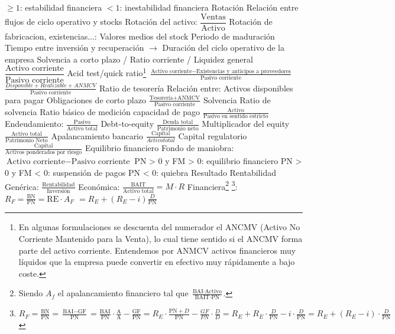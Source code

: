 \documentclass{nuevotema}
\begin{document}
\begin{esquemal}
				\4 $\geq 1$: estabilidad financiera
				\4 $<1$: inestabilidad financiera
			\3 Rotación
				\4 Relación entre flujos de ciclo operativo y stocks
				\4 Rotación del activo:
				\4[] $\dfrac{\text{Ventas}}{\text{Activo}}$
				\4 Rotación de fabricacion, existencias...:
				\4[] Valores medios del stock
			\3 Periodo de maduración
				\4 Tiempo entre inversión y recuperación
				\4[] $\to$ Duración del ciclo operativo de la empresa
			\3 Solvencia a corto plazo / Ratio corriente / Liquidez general
				\4 $\dfrac{\text{Activo corriente}}{\text{Pasivo corriente}}$
			\3 Acid test/quick ratio\footnote{En algunas formulaciones se descuenta del numerador el ANCMV (Activo No Corriente Mantenido para la Venta), lo cual tiene sentido si el ANCMV forma parte del activo corriente. Entendemos por ANMCV activos financieros muy líquidos que la empresa puede convertir en efectivo muy rápidamente a bajo coste.}
				\4 $\frac{\text{Activo corriente}-\text{Existencias y anticipos a proveedores} }{\text{Pasivo corriente}}$
				\4 $\frac{Disponible + Realizable + ANMCV}{\text{Pasivo corriente}}$
			\3 Ratio de tesorería
				\4 Relación entre:
				\4[] Activos disponibles para pagar
				\4[] Obligaciones de corto plazo
				\4 $\frac{\text{Tesorería+ANMCV}}{\text{Pasivo corriente}}$
		\2 Solvencia
			\3 Ratio de solvencia
				\4 Ratio básico de medición capacidad de pago
				\4[] $\frac{\text{Activo}}{\text{Pasivo en sentido estricto}}$
			\3 Endeudamiento:
				\4 $\frac{\text{Pasivo}}{\text{Activo total}}$
			\3 Debt-to-equity
				\4 $\frac{\text{Deuda total}}{\text{Patrimonio neto}}$
			\3 Multiplicador del equity
				\4 $\frac{\text{Activo total}}{\text{Patrimonio Neto}}$
			\3 Apalancamiento bancario
				\4 $\frac{\text{Capital}}{Activo total}$
			\3 Capital regulatorio
				\4 $\frac{\text{Capital}}{\text{Activos ponderados por riesgo}}$
			\3 Equilibrio financiero
				\4 Fondo de maniobra: $\text{Activo corriente}-\text{Pasivo corriente}$
				\4 PN > 0 y FM > 0: equilibrio financiero
				\4 PN > 0 y FM < 0: suspensión de pagos
				\4 PN < 0: quiebra
		\2 Resultado
			\3 Rentabilidad
				\4 Genérica: $\frac{\text{Rentabilidad}}{\text{Inversión}}$
				\4 Económica: $\frac{\text{BAIT}}{\text{Activo total}} = M \cdot R$
				\4 Financiera\footnote{Siendo $A_f$ el apalancamiento financiero tal que $\frac{\text{BAI}\cdot \text{Activo}}{\text{BAIT}\cdot \text{PN}}$.} \footnote{$R_F = \frac{\text{BN}}{\text{PN}} = \frac{\text{BAI}-\text{GF}}{\text{PN}} = \frac{\text{BAI}}{\text{PN}} \cdot \frac{\text{A}}{\text{A}} - \frac{\text{GF}}{\text{PN}} = R_E \cdot \frac{\text{PN}+D}{\text{PN}} - \frac{GF}{PN}\cdot \frac{D}{D} = R_E + R_E \cdot \frac{D}{\text{PN}} - i\cdot \frac{D}{\text{PN}} = R_E + \left( R_E - i \right) \cdot \frac{D}{\text{PN}}$}: $R_F = \frac{\text{BN}}{\text{PN}} = \text{RE}\cdot A_F$ $= R_E + (R_E-i)\frac{D}{\text{PN}}$

\end{esquemal}
\end{document}
